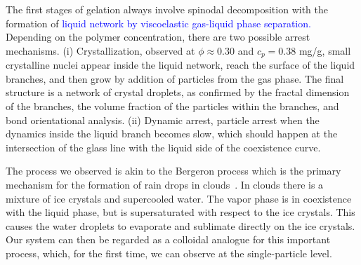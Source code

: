 \documentclass[12pt]{article}
\begin{document}
The first stages of gelation always involve spinodal decomposition with the formation
of \textcolor{blue}{liquid network by viscoelastic gas-liquid phase separation.} 
Depending on the polymer concentration, there are two possible arrest mechanisms. 
(i) Crystallization, observed at $\phi\approx 0.30$ and $c_p=0.38$ mg/g, small crystalline nuclei appear inside the liquid network, reach the surface 
 of the liquid branches, and then grow by addition of particles from the gas phase. The final structure is a network of crystal droplets,
 as confirmed by the fractal dimension of the branches, the volume fraction of the particles within the branches, and bond orientational analysis. 
(ii) Dynamic arrest, particle arrest when the dynamics inside the liquid branch becomes slow, which should happen at the intersection of the
 glass line with the liquid side of the coexistence curve. 

The process we observed is akin to the Bergeron process which is the primary mechanism for the formation of rain drops in clouds~\cite{glickman2000glossary,morrison2012resilience}.
In clouds there is a mixture of ice crystals and supercooled water. The vapor phase is in coexistence with the liquid phase, but is supersaturated
with respect to the ice crystals. This causes the water droplets to evaporate and sublimate directly on the ice crystals. Our system can then
be regarded as a colloidal analogue for this important process, which, for the first time, we can observe at the single-particle level.  
\end{document}
